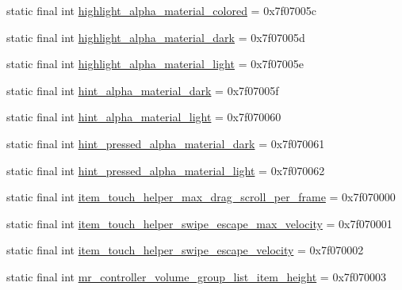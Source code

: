 \begin{CompactItemize}
\item 
static final int \hyperlink{classandroid_1_1support_1_1graphics_1_1drawable_1_1animated_1_1_r_1_1dimen_c36c033ccd5ec08f6fa0cb8b39307ab8}{highlight\_\-alpha\_\-material\_\-colored} = 0x7f07005c
\item 
static final int \hyperlink{classandroid_1_1support_1_1graphics_1_1drawable_1_1animated_1_1_r_1_1dimen_09cdc61ecdec676d251dac0dd01556f8}{highlight\_\-alpha\_\-material\_\-dark} = 0x7f07005d
\item 
static final int \hyperlink{classandroid_1_1support_1_1graphics_1_1drawable_1_1animated_1_1_r_1_1dimen_3b6c62223b7e72679835503d4ff33a3e}{highlight\_\-alpha\_\-material\_\-light} = 0x7f07005e
\item 
static final int \hyperlink{classandroid_1_1support_1_1graphics_1_1drawable_1_1animated_1_1_r_1_1dimen_7750e364f5c1f5750ec1ac94965971e6}{hint\_\-alpha\_\-material\_\-dark} = 0x7f07005f
\item 
static final int \hyperlink{classandroid_1_1support_1_1graphics_1_1drawable_1_1animated_1_1_r_1_1dimen_eddb0cd266bb4fcd051e077edfc6790a}{hint\_\-alpha\_\-material\_\-light} = 0x7f070060
\item 
static final int \hyperlink{classandroid_1_1support_1_1graphics_1_1drawable_1_1animated_1_1_r_1_1dimen_1b82ffdafeb0e73a0f21b9ac17a0f9bd}{hint\_\-pressed\_\-alpha\_\-material\_\-dark} = 0x7f070061
\item 
static final int \hyperlink{classandroid_1_1support_1_1graphics_1_1drawable_1_1animated_1_1_r_1_1dimen_321c0ae0612d088ba0713a8c578a0eee}{hint\_\-pressed\_\-alpha\_\-material\_\-light} = 0x7f070062
\item 
static final int \hyperlink{classandroid_1_1support_1_1graphics_1_1drawable_1_1animated_1_1_r_1_1dimen_2707aecb628ed7a9d5a56f7080166334}{item\_\-touch\_\-helper\_\-max\_\-drag\_\-scroll\_\-per\_\-frame} = 0x7f070000
\item 
static final int \hyperlink{classandroid_1_1support_1_1graphics_1_1drawable_1_1animated_1_1_r_1_1dimen_7a92df76f6afb3fe69712ffea4addf42}{item\_\-touch\_\-helper\_\-swipe\_\-escape\_\-max\_\-velocity} = 0x7f070001
\item 
static final int \hyperlink{classandroid_1_1support_1_1graphics_1_1drawable_1_1animated_1_1_r_1_1dimen_937e760c8f44d25092710dfc362b316c}{item\_\-touch\_\-helper\_\-swipe\_\-escape\_\-velocity} = 0x7f070002
\item 
static final int \hyperlink{classandroid_1_1support_1_1graphics_1_1drawable_1_1animated_1_1_r_1_1dimen_dde55f3d627bf3757deeac6d49e96fb6}{mr\_\-controller\_\-volume\_\-group\_\-list\_\-item\_\-height} = 0x7f070003

\end{CompactItemize}

